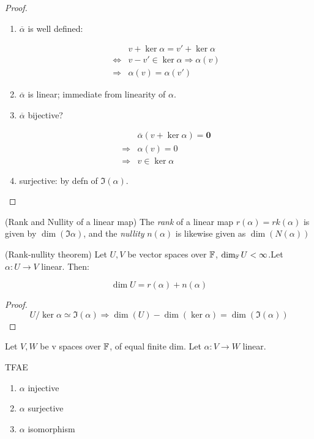 \documentclass[a4paper]{article}
\begin{document}
\begin{proof}
	\begin{enumerate}
		\item  $ \overline{\alpha} $ is well defined:
	
	\begin{align*}
	& v + \ker \alpha = v' + \ker \alpha \\
	\iff &  v - v' \in \ker \alpha \Rightarrow \alpha(v) \\
	\Rightarrow &  \alpha(v) = \alpha(v')
	\end{align*}
	
	\item $ \overline{\alpha} $ is linear; immediate from linearity of $ \alpha $.
	
	\item $ \overline{\alpha} $ bijective? 
	
	\begin{align*}
	& \overline{\alpha}(v + \ker \alpha  ) = \mathbf{0} \\
	\Rightarrow & \alpha(v) = 0 \\
	\Rightarrow &  v \in \ker \alpha 
	\end{align*}
	
	
	\item surjective: by defn of $ \Im(\alpha) $.		
	\end{enumerate}


	
	
\end{proof}


\begin{defi} (Rank and Nullity of a linear map)
	The \emph{rank} of a linear map $  r(\alpha) = rk(\alpha) $ is given by $ \dim (\Im \alpha)  $, and the \emph{nullity} $ n(\alpha) $ is likewise given as $ \dim(N(\alpha)) $
\end{defi}

\begin{thm} (Rank-nullity theorem)
	Let $ U,V $ be vector spaces over $ \mathbb{F} $, $ \dim_{\mathbb{F}} U < \infty $.Let $ \alpha : U \to V $ linear. Then:
	
	\[ \dim U = r(\alpha) + n(\alpha) \]
\end{thm}


\begin{proof}
	\[ U / \ker \alpha \simeq \Im (\alpha) \Rightarrow \dim(U) - \dim (\ker \alpha) = \dim (\Im(\alpha) )\]
\end{proof}

\begin{lemma} 
	Let $ V,W $ be v spaces over $ \mathbb{F} $, of equal finite dim. Let $ \alpha : V \to W $ linear. 
	
	TFAE
	
	\begin{enumerate}
		\item $ \alpha $ injective
		\item $ \alpha $ surjective
		\item $ \alpha $ isomorphism
		
	\end{enumerate}
\end{lemma}
\end{document}

